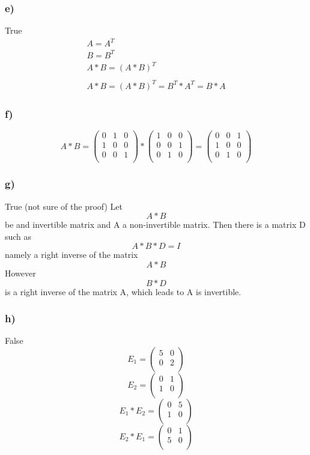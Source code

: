 \documentclass[lineaire_algebra_oplossingen.tex]{subfiles}
\begin{document}
\subsubsection*{e)}
 True
\begin{gather*}
A=A^{T}\\
B=B^{T}\\
A*B=(A*B)^{T}\\
\\
A*B=(A*B)^{T}=B^T*A^T=B*A
\end{gather*}

\subsubsection*{f)}
\[
A*B = \left( \begin{array}{ccc}
    0 & 1 & 0 \\
    1 & 0 & 0 \\
    0 & 0 & 1 \\
  \end{array} \right) * \left( \begin{array}{ccc}
    1 & 0 & 0 \\
    0 & 0 & 1 \\
    0 & 1 & 0 \\
  \end{array} \right) = \left( \begin{array}{ccc}
    0 & 0 & 1 \\
    1 & 0 & 0 \\
    0 & 1 & 0 \\
 \end{array} \right) 
 \]

\subsubsection*{g)}
True (not sure of the proof)
Let \[A*B\] be and invertible matrix and A a non-invertible matrix. Then there is a matrix D such  as \[A*B*D=I\] namely a right inverse of the matrix \[A*B\] However \[B*D\] is a right inverse of the matrix  A, which leads to A is invertible.

\subsubsection*{h)}
 False
\[
E_1=\left( \begin{array}{cc}
    5 & 0\\
    0 & 2\\
\end{array}\right)
\]
\[
E_2=\left( \begin{array}{cc}
    0 & 1\\
    1 & 0\\
\end{array}\right)
\]
\[
E_1*E_2=\left( \begin{array}{cc}
    0 & 5\\
    1 & 0\\
\end{array}\right)
\]
\[
E_2*E_1=\left( \begin{array}{cc}
    0 & 1\\
    5 & 0\\
\end{array}\right)
\]
\end{document}
